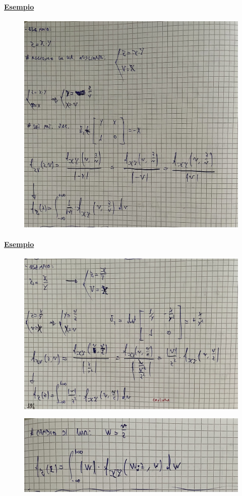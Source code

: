 \documentclass{article}
\begin{document}
\paragraph{\underline{Esempio}}
\begin{figure}[H]
\centering
\includegraphics[scale=0.16]{ese/49.jpeg}
\end{figure} 
\paragraph{\underline{Esempio}}
\begin{figure}[H]
\centering
\includegraphics[scale=0.16]{ese/50.jpeg}
\end{figure} 
\begin{figure}[H]
\centering
\includegraphics[scale=0.16]{ese/50a.jpeg}
\end{figure} 
\end{document}
